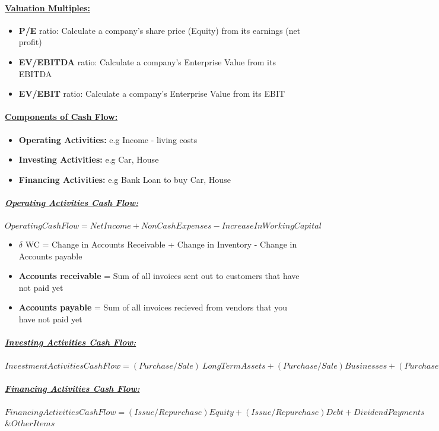 \documentclass[8pt]{extreport}
\begin{document}
{\paragraph{\underline{Valuation Multiples:}}
\begin{itemize}
\item \textbf{P/E} ratio: Calculate a company's share price (Equity) from its earnings (net profit)
\item \textbf{EV/EBITDA} ratio: Calculate a company's Enterprise Value from its EBITDA
\item \textbf{EV/EBIT} ratio: Calculate a company's Enterprise Value from its EBIT
\end{itemize}
\paragraph{\underline{Components of Cash Flow:}}
\begin{itemize}
\item \textbf{Operating Activities:} e.g Income - living costs
\item \textbf{Investing Activities:} e.g Car, House 
\item \textbf{Financing Activities:}  e.g Bank Loan to buy Car, House
\end{itemize}
\subparagraph{\underline{Operating Activities Cash Flow:}}
\begin{center}
$Operating Cash Flow = Net Income + Non Cash Expenses - Increase In Working Capital$
\end{center}
\begin{itemize}
\item $\delta$ WC = Change in Accounts Receivable + Change in Inventory - Change in Accounts payable
\item \textbf{Accounts receivable} = Sum of all invoices sent out to customers that have not paid yet
\item \textbf{Accounts payable} = Sum of all invoices recieved from vendors that you have not paid yet
\end{itemize}
\subparagraph{\underline{Investing Activities Cash Flow:}}
\begin{center}
$Investment Activities Cash Flow = (Purchase/Sale) \  Long Term Assets + (Purchase/Sale) Businesses + (Purchase/Sale) Marketable Securities$
\end{center}
\subparagraph{\underline{Financing Activities Cash Flow:}}
\begin{center}
$Financing Activities Cash Flow = (Issue/Repurchase) Equity + (Issue/Repurchase) Debt + Dividend Payments$\&$Other Items$
\end{center}
}
\end{document}
